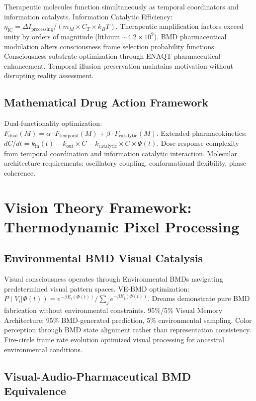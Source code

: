 \documentclass[12pt,a4paper]{article}
\begin{document}
Therapeutic molecules function simultaneously as temporal coordinators and information catalysts. Information Catalytic Efficiency: $\eta_{\text{IC}} = \Delta I_{\text{processing}} / (m_M \times C_T \times k_B T)$. Therapeutic amplification factors exceed unity by orders of magnitude (lithium $\sim 4.2 \times 10^9$). BMD pharmaceutical modulation alters consciousness frame selection probability functions. Consciousness substrate optimization through ENAQT pharmaceutical enhancement. Temporal illusion preservation maintains motivation without disrupting reality assessment.

\subsection{Mathematical Drug Action Framework}

Dual-functionality optimization: $F_{\text{dual}}(M) = \alpha \cdot F_{\text{temporal}}(M) + \beta \cdot F_{\text{catalytic}}(M)$. Extended pharmacokinetics: $dC/dt = k_{\text{in}}(t) - k_{\text{out}} \times C - k_{\text{catalytic}} \times C \times \Psi(t)$. Dose-response complexity from temporal coordination and information catalytic interaction. Molecular architecture requirements: oscillatory coupling, conformational flexibility, phase coherence.

\section{Vision Theory Framework: Thermodynamic Pixel Processing}

\subsection{Environmental BMD Visual Catalysis}

Visual consciousness operates through Environmental BMDs navigating predetermined visual pattern spaces. VE-BMD optimization: $P(V_i | \Phi(t)) = e^{-\beta E_i(\Phi(t))} / \sum_j e^{-\beta E_j(\Phi(t))}$. Dreams demonstrate pure BMD fabrication without environmental constraints. 95\%/5\% Visual Memory Architecture: 95\% BMD-generated prediction, 5\% environmental sampling. Color perception through BMD state alignment rather than representation consistency. Fire-circle frame rate evolution optimized visual processing for ancestral environmental conditions.

\subsection{Visual-Audio-Pharmaceutical BMD Equivalence}
\end{document}
